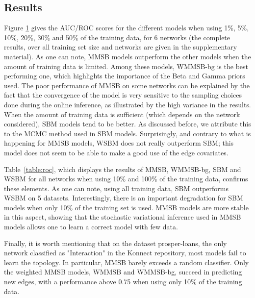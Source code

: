 \begin{figure}[h]
\centering
	
   \label{fig:roc}
\end{figure}

\subsection{Results}
Figure \ref{fig:roc} gives the AUC/ROC scores for the different models when using 1\%, 5\%, 10\%, 20\%, 30\% and 50\% of the training data, for 6 networks (the complete results, over all training set size and networks are given in the supplementary material). As one can note, MMSB models outperform the other models when the amount of training data is limited. Among these models, WMMSB-bg is the best performing one, which highlights the importance of the Beta and Gamma priors used. The poor performance of MMSB on some networks can be explained by the fact that the convergence of the model is very sensitive to the sampling choices done during the online inference, as illustrated by the high variance in the results. When the amount of training data is sufficient (which depends on the network considered), SBM models tend to be better. As discussed before, we attribute this to the MCMC method used in SBM models. Surprisingly, and contrary to what is happening for MMSB models, WSBM does not really outperform SBM; this model does not seem to be able to make a good use of the edge covariates. 

Table~\ref{table:roc}, which displays the results of MMSB, WMMSB-bg, SBM and WSBM for all networks when using 10\% and 100\% of the training data, confirms these elements. As one can note, using all training data, SBM outperforms WSBM on 5 datasets. Interestingly, there is an important degradation for SBM models when only 10\% of the training set is used. MMSB models are more stable in this aspect, showing that the stochastic variational inference used in MMSB models allows one to learn a correct model with few data.

Finally, it is worth mentioning that on the dataset prosper-loans, the only network classified as "Interaction" in the Konnect repository, most models fail to learn the topology. In particular, MMSB barely exceeds a random classifier. Only the weighted MMSB models, WMMSB and WMMSB-bg, succeed in predicting new edges, with a performance above 0.75 when using only 10\% of the training data.
 
